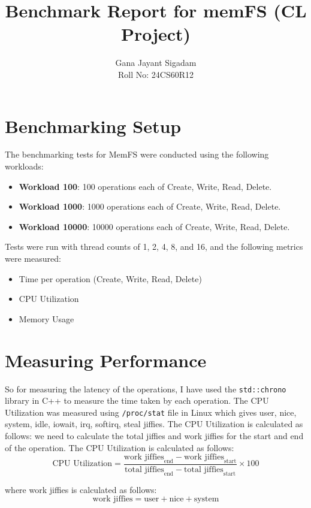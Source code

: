 \documentclass{article}
\title{Benchmark Report for memFS (CL Project)}
\author{
      Gana Jayant Sigadam \\
      Roll No: 24CS60R12 \\
}
\begin{document}
\maketitle

\section{Benchmarking Setup}

\noindent The benchmarking tests for MemFS were conducted using the following workloads:
\begin{itemize}
    \item \textbf{Workload 100}: 100 operations each of Create, Write, Read, Delete.
    \item \textbf{Workload 1000}: 1000 operations each of Create, Write, Read, Delete.
    \item \textbf{Workload 10000}: 10000 operations each of Create, Write, Read, Delete.
\end{itemize}

\noindent Tests were run with thread counts of 1, 2, 4, 8, and 16, and the following metrics were measured:
\begin{itemize}
    \item Time per operation (Create, Write, Read, Delete)
    \item CPU Utilization
    \item Memory Usage
\end{itemize}


\section{Measuring Performance}
So for measuring the latency of the operations, I have used the \texttt{std::chrono} library in C++ to measure the time taken by each operation. The CPU Utilization was measured using \texttt{/proc/stat} file in Linux which gives user, nice, system, idle, iowait, irq, softirq, steal jiffies. The CPU Utilization is calculated as follows:
we need to calculate the total jiffies and work jiffies for the start and end of the operation. The CPU Utilization is calculated as follows:
\[
\text{CPU Utilization} = \frac{\text{work jiffies}_{\text{end}} - \text{work jiffies}_{\text{start}}}{\text{total jiffies}_{\text{end}} - \text{total jiffies}_{\text{start}}} \times 100
\]

where work jiffies is calculated as follows:
\[
\text{work jiffies} = \text{user} + \text{nice} + \text{system}
\]
\end{document}
